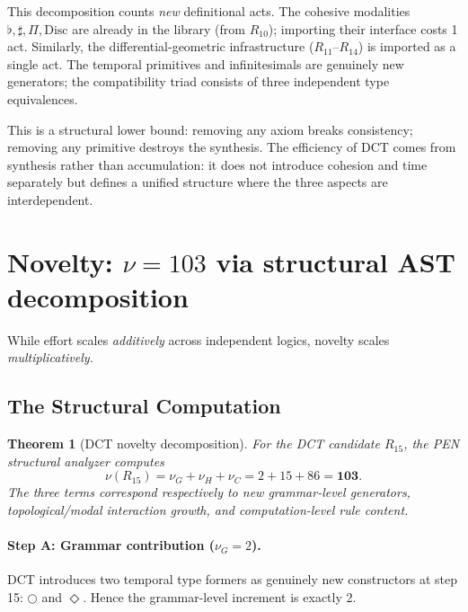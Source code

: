 \documentclass[11pt,a4paper]{article}
\theoremstyle{plain}
\newtheorem{theorem}{Theorem}[section]
\theoremstyle{definition}
\theoremstyle{remark}
\newcommand{\Disc}{\mathrm{Disc}}
\begin{document}
This decomposition counts \emph{new} definitional acts.
The cohesive modalities $\flat, \sharp, \Pi, \Disc$ are already in the library (from $R_{10}$); importing their interface costs 1 act.
Similarly, the differential-geometric infrastructure ($R_{11}$--$R_{14}$) is imported as a single act.
The temporal primitives and infinitesimals are genuinely new generators; the compatibility triad consists of three independent type equivalences.

This is a structural lower bound: removing any axiom breaks consistency; removing any primitive destroys the synthesis.
The efficiency of DCT comes from synthesis rather than accumulation: it does not introduce cohesion and time separately but defines a unified structure where the three aspects are interdependent.

\section{Novelty: $\nu = 103$ via structural AST decomposition}
\label{sec:nu}

While effort scales \emph{additively} across independent logics, novelty scales \emph{multiplicatively}.

\subsection{The Structural Computation}

\begin{theorem}[DCT novelty decomposition]
\label{thm:dct-nu}
For the DCT candidate $R_{15}$, the PEN structural analyzer computes
\begin{equation}
    \nu(R_{15}) = \nu_G + \nu_H + \nu_C = 2 + 15 + 86 = \mathbf{103}.
\end{equation}
The three terms correspond respectively to new grammar-level generators, topological/modal interaction growth, and computation-level rule content.
\end{theorem}

\paragraph{Step A: Grammar contribution ($\nu_G=2$).}
DCT introduces two temporal type formers as genuinely new constructors at step 15: $\bigcirc$ and $\Diamond$.
Hence the grammar-level increment is exactly 2.
\end{document}
